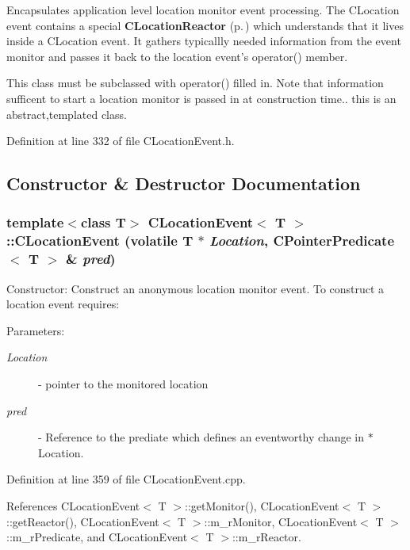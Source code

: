 Encapsulates application level location monitor event processing. The CLocation event contains a special  {\bf CLocation\-Reactor} {\rm (p.\,\pageref{classCLocationReactor})} which understands that it lives inside a CLocation event. It gathers typicallly needed information from the event monitor and passes it back to the location event's operator() member.

This class must be subclassed with operator() filled in. Note that information sufficent to start a location monitor is passed in at construction time.. this is an abstract,templated class. 



Definition at line 332 of file CLocation\-Event.h.

\subsection{Constructor \& Destructor Documentation}
\subsubsection{\setlength{\rightskip}{0pt plus 5cm}template$<$class T$>$ CLocation\-Event$<$ T $>$::CLocation\-Event (volatile T $\ast$ {\em Location}, {\bf CPointer\-Predicate}$<$ T $>$ \& {\em pred})}\label{classCLocationEvent_a0}


Constructor: Construct an anonymous location monitor event. To construct a location event requires:\begin{Desc}
\item[Parameters: ]\par
\begin{description}
\item[{\em 
Location}]- pointer to the monitored location \item[{\em 
pred}]- Reference to the prediate which defines an eventworthy change in $\ast$Location. \end{description}
\end{Desc}


Definition at line 359 of file CLocation\-Event.cpp.

References CLocation\-Event$<$ T $>$::get\-Monitor(), CLocation\-Event$<$ T $>$::get\-Reactor(), CLocation\-Event$<$ T $>$::m\_\-r\-Monitor, CLocation\-Event$<$ T $>$::m\_\-r\-Predicate, and CLocation\-Event$<$ T $>$::m\_\-r\-Reactor.
